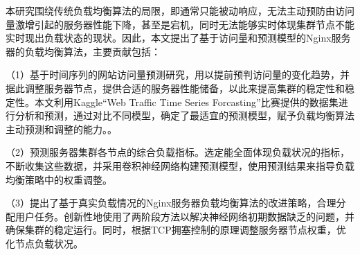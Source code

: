 \begin{cabstract}

	本研究围绕传统负载均衡算法的局限，即通常只能被动响应，无法主动预防由访问量激增引起的服务器性能下降，甚至是宕机，同时无法能够实时体现集群节点不能实时现出负载状态的现状。因此，本文提出了基于访问量和预测模型的Nginx服务器的负载均衡算法，主要贡献包括：

	（1）基于时间序列的网站访问量预测研究，用以提前预判访问量的变化趋势，并据此调整服务器节点，提供合适的服务器性能储备，以此来提高集群的稳定性和稳定性。本文利用Kaggle“Web Traffic Time Series Forcasting”比赛提供的数据集进行分析和预测，通过对比不同模型，确定了最适宜的预测模型，赋予负载均衡算法主动预测和调整的能力。。

	（2）预测服务器集群各节点的综合负载指标。选定能全面体现负载状况的指标，不断收集这些数据，并采用卷积神经网络构建预测模型，使用预测结果来指导负载均衡策略中的权重调整。

	（3）提出了基于真实负载情况的Nginx服务器负载均衡算法的改进策略，合理分配用户任务。创新性地使用了两阶段方法以解决神经网络初期数据缺乏的问题，并确保集群的稳定运行。同时，根据TCP拥塞控制的原理调整服务器节点权重，优化节点负载状况。

\end{cabstract}



